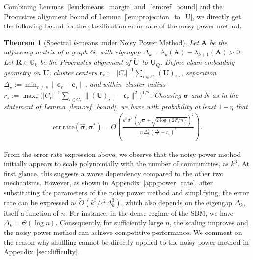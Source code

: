 \documentclass[11pt]{article}
\theoremstyle{plain}
\newtheorem{theorem}{Theorem}[section]
\theoremstyle{definition}
\theoremstyle{remark}
\begin{document}
Combining Lemmas~\ref{lem:kmeans_margin} and~\ref{lem:ref_bound} and the Procustres alignment bound of Lemma~\ref{lem:projection_to_U}, we directly get the following bound for the classification error rate of the noisy power method.

\begin{theorem}[Spectral $k$-means under Noisy Power Method]
\label{thm:main_explicit_power_method}
Let $\mathbf{A}$ be the adjacency matrix of a graph $G$, with eigengap $\Delta_k=\lambda_{k}(\mathbf{A})-\lambda_{k+1}(\mathbf{A})>0$. 
Let $\mathbf{R}\in\mathbb{O}_k$ be the Procrustes alignment of $\widetilde{\mathbf{U}}$ to $\mathbf{U}_Q$.
Define clean embedding geometry on $\mathbf{U}$: cluster centers
$\mathbf{c}_r:=|C_r|^{-1}\sum_{i\in C_r}(\mathbf{U})_{i,:}$, separation
$\Delta_\star:=\min_{r\ne s}\|\mathbf{c}_r-\mathbf{c}_s\|$, and within–cluster radius
$r_\star:=\max_r\big(|C_r|^{-1}\sum_{i\in C_r}\|(\mathbf{U})_{i,:}-\mathbf{c}_r\|^2\big)^{1/2}$.
Choosing $\bm{\sigma}$ and $N$ as in the statement of Lemma~\ref{lem:ref_bound}, we have with probability at least $1-\eta$ that
\begin{equation*}
    \begin{aligned}
\mathrm{err\,rate}(\hat{\bm{\sigma}},\bm{\sigma}^\ast)
=
 O\!\left( \frac{ k^3 \, \bar{\sigma}^2 \, \left( \sqrt{n} + \sqrt{2 \log\left( {2N}/{\eta} \right)} \right)^2}{n \, \Delta_k^2\,(\tfrac{\Delta_\star}{2}-r_\star)^2}
\right).        
    \end{aligned}
\end{equation*}
\end{theorem}
From the error rate expression above, we observe that the noisy power method initially appears to scale polynomially with the number of communities, as $k^{3}$. At first glance, this suggests a worse dependency compared to the other two mechanisms. However, as shown in Appendix~\ref{app:power_rate}, after substituting the parameters of the noisy power method and simplifying, the error rate can be expressed as
$\tilde{O}\!\left({{k^{3}}/{\varepsilon^2 \Delta_k^{3}}}\right)$, 
which also depends on the eigengap $\Delta_{k}$, itself a function of $n$. For instance, in the dense regime of the SBM, we have $\Delta_{k} = \Theta(\log n)$. Consequently, for sufficiently large $n$, the scaling improves and the noisy power method can achieve competitive performance.
We comment on the reason why shuffling cannot be directly applied to the noisy power method in Appendix~\ref{sec:difficulty}.
\end{document}
